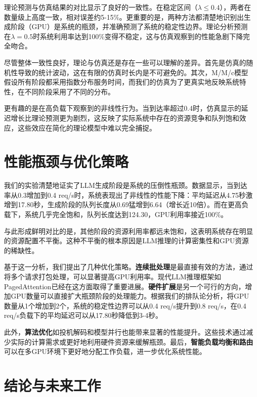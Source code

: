 \documentclass[a4paper]{article}
\begin{document}
理论预测与仿真结果的对比显示了良好的一致性。在稳定区间（$\lambda \leq 0.4$），两者在数量级上高度一致，相对误差约5-15\%。更重要的是，两种方法都清楚地识别出生成阶段（GPU）是系统的瓶颈，并准确预测了系统的稳定性边界。理论分析预测在$\lambda=0.5$时系统利用率达到100\%变得不稳定，这与仿真观察到的性能急剧下降完全吻合。

尽管整体一致性良好，理论与仿真还是存在一些可以理解的差异。首先是仿真的随机性导致的统计波动，这在有限的仿真时长内是不可避免的。其次，M/M/c模型假设所有阶段都采用指数分布服务时间，而我们的仿真为了更真实地反映系统特性，在不同阶段采用了不同的分布。

更有趣的是在高负载下观察到的非线性行为。当到达率超过0.4时，仿真显示的延迟增长比理论预测更为剧烈，这反映了实际系统中存在的资源竞争和队列饱和效应，这些效应在简化的理论模型中难以完全捕捉。

\section{性能瓶颈与优化策略}

我们的实验清楚地证实了LLM生成阶段是系统的压倒性瓶颈。数据显示，当到达率从0.3增加到0.4 req/s时，系统表现出了非线性的性能下降：平均延迟从4.75秒激增到17.80秒，生成阶段的队列长度从0.69猛增到6.64（增长近10倍）。而在更高负载下，系统几乎完全饱和，队列长度达到124.30，GPU利用率接近100\%。

与此形成鲜明对比的是，其他阶段的资源利用率都远未饱和，这表明系统存在明显的资源配置不平衡。这种不平衡的根本原因是LLM推理的计算密集性和GPU资源的稀缺性。

基于这一分析，我们提出了几种优化策略。\textbf{连续批处理}是最直接有效的方法，通过将多个请求打包处理，可以显著提高GPU利用率。现代LLM推理框架如PagedAttention\cite{kwon2023efficient}已经在这方面取得了重要进展。\textbf{硬件扩展}是另一个可行的方向，增加GPU数量可以直接扩大瓶颈阶段的处理能力。根据我们的排队论分析，将GPU数量从1个增加到2个，系统的稳定性边界可以从0.4 req/s提升到0.8 req/s，在0.4 req/s负载下的平均延迟可以从17.80秒降低到3-4秒。

此外，\textbf{算法优化}如投机解码\cite{sheng2023highthroughput}和模型并行也能带来显著的性能提升。这些技术通过减少实际的计算需求或更好地利用硬件资源来缓解瓶颈。最后，\textbf{智能负载均衡和路由}\cite{yu2022orca}可以在多GPU环境下更好地分配工作负载，进一步优化系统性能。

\section{结论与未来工作}
\end{document}
